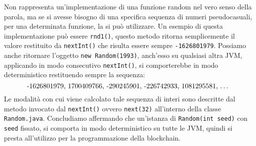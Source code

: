 		Non rappresenta un'implementazione di una funzione random nel vero senso della parola, ma se si avesse bisogno di una specifica sequenza di numeri pseudocasuali, per una determinata funzione, la si può utilizzare. Un esempio di questa implementazione può essere \lstinline|rnd1()|, questo metodo ritorna semplicemente il valore restituito da \lstinline|nextInt()| che risulta essere sempre \lstinline|-1626801979|. Possiamo anche ritornare l'oggetto \lstinline|new Random(1993)|, anch'esso su qualsiasi altra JVM, applicando in modo consecutivo \lstinline|nextInt()|, si comporterebbe in modo deterministico restituendo sempre la sequenza:
		\[ \text{-1626801979, 1700409766, -290245901, -226742933, 1081295581, \dots}\]
		Le modalità con cui viene calcolato tale sequenza di interi sono descritte dal metodo invocato dal \lstinline|nextInt()| ovvero \lstinline|next(32)| all'interno della classe \lstinline|Random.java|.
		Concludiamo affermando che un'istanza di \lstinline|Random(int seed)| con \lstinline|seed| fissato, si comporta in modo deterministico su tutte le JVM, quindi si presta all'utilizzo per la programmazione della blockchain.